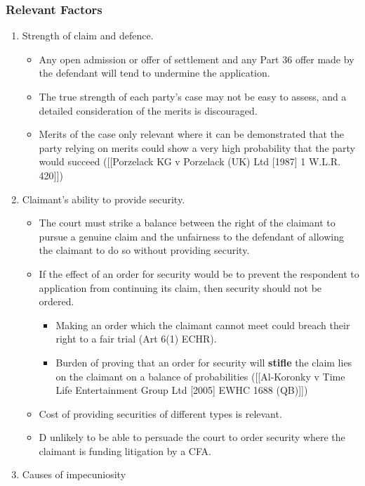 \documentclass[
]{article}
\providecommand{\tightlist}{%
  \setlength{\itemsep}{0pt}\setlength{\parskip}{0pt}}
\begin{document}
\hypertarget{relevant-factors}{%
\subsubsection{Relevant Factors}\label{relevant-factors}}

\begin{enumerate}
\def\labelenumi{\arabic{enumi}.}
\tightlist
\item
  Strength of claim and defence.

  \begin{itemize}
  \tightlist
  \item
    Any open admission or offer of settlement and any Part 36 offer made
    by the defendant will tend to undermine the application.
  \item
    The true strength of each party's case may not be easy to assess,
    and a detailed consideration of the merits is discouraged.
  \item
    Merits of the case only relevant where it can be demonstrated that
    the party relying on merits could show a very high probability that
    the party would succeed ({[}{[}Porzelack KG v Porzelack (UK) Ltd
    {[}1987{]} 1 W.L.R. 420{]}{]})
  \end{itemize}
\item
  Claimant's ability to provide security.

  \begin{itemize}
  \tightlist
  \item
    The court must strike a balance between the right of the claimant to
    pursue a genuine claim and the unfairness to the defendant of
    allowing the claimant to do so without providing security.
  \item
    If the effect of an order for security would be to prevent the
    respondent to application from continuing its claim, then security
    should not be ordered.

    \begin{itemize}
    \tightlist
    \item
      Making an order which the claimant cannot meet could breach their
      right to a fair trial (Art 6(1) ECHR).
    \item
      Burden of proving that an order for security will \textbf{stifle}
      the claim lies on the claimant on a balance of probabilities
      ({[}{[}Al-Koronky v Time Life Entertainment Group Ltd {[}2005{]}
      EWHC 1688 (QB){]}{]})
    \end{itemize}
  \item
    Cost of providing securities of different types is relevant.
  \item
    D unlikely to be able to persuade the court to order security where
    the claimant is funding litigation by a CFA.
  \end{itemize}
\item
  Causes of impecuniosity


\end{enumerate}
\end{document}
